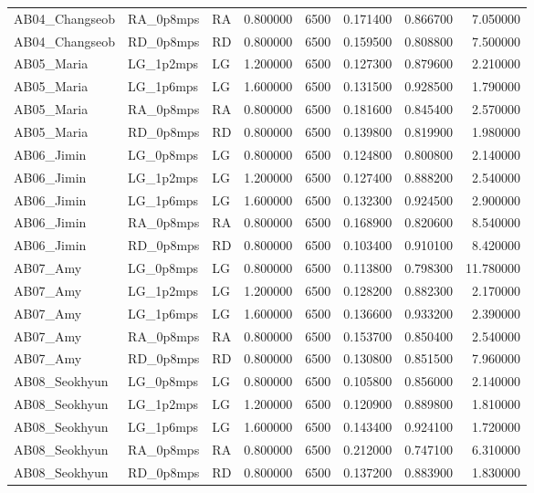 \begin{table}
\begin{tabular}{lllrrrrr}
AB04\_Changseob & RA\_0p8mps & RA & 0.800000 & 6500 & 0.171400 & 0.866700 & 7.050000 \\
AB04\_Changseob & RD\_0p8mps & RD & 0.800000 & 6500 & 0.159500 & 0.808800 & 7.500000 \\
AB05\_Maria & LG\_1p2mps & LG & 1.200000 & 6500 & 0.127300 & 0.879600 & 2.210000 \\
AB05\_Maria & LG\_1p6mps & LG & 1.600000 & 6500 & 0.131500 & 0.928500 & 1.790000 \\
AB05\_Maria & RA\_0p8mps & RA & 0.800000 & 6500 & 0.181600 & 0.845400 & 2.570000 \\
AB05\_Maria & RD\_0p8mps & RD & 0.800000 & 6500 & 0.139800 & 0.819900 & 1.980000 \\
AB06\_Jimin & LG\_0p8mps & LG & 0.800000 & 6500 & 0.124800 & 0.800800 & 2.140000 \\
AB06\_Jimin & LG\_1p2mps & LG & 1.200000 & 6500 & 0.127400 & 0.888200 & 2.540000 \\
AB06\_Jimin & LG\_1p6mps & LG & 1.600000 & 6500 & 0.132300 & 0.924500 & 2.900000 \\
AB06\_Jimin & RA\_0p8mps & RA & 0.800000 & 6500 & 0.168900 & 0.820600 & 8.540000 \\
AB06\_Jimin & RD\_0p8mps & RD & 0.800000 & 6500 & 0.103400 & 0.910100 & 8.420000 \\
AB07\_Amy & LG\_0p8mps & LG & 0.800000 & 6500 & 0.113800 & 0.798300 & 11.780000 \\
AB07\_Amy & LG\_1p2mps & LG & 1.200000 & 6500 & 0.128200 & 0.882300 & 2.170000 \\
AB07\_Amy & LG\_1p6mps & LG & 1.600000 & 6500 & 0.136600 & 0.933200 & 2.390000 \\
AB07\_Amy & RA\_0p8mps & RA & 0.800000 & 6500 & 0.153700 & 0.850400 & 2.540000 \\
AB07\_Amy & RD\_0p8mps & RD & 0.800000 & 6500 & 0.130800 & 0.851500 & 7.960000 \\
AB08\_Seokhyun & LG\_0p8mps & LG & 0.800000 & 6500 & 0.105800 & 0.856000 & 2.140000 \\
AB08\_Seokhyun & LG\_1p2mps & LG & 1.200000 & 6500 & 0.120900 & 0.889800 & 1.810000 \\
AB08\_Seokhyun & LG\_1p6mps & LG & 1.600000 & 6500 & 0.143400 & 0.924100 & 1.720000 \\
AB08\_Seokhyun & RA\_0p8mps & RA & 0.800000 & 6500 & 0.212000 & 0.747100 & 6.310000 \\
AB08\_Seokhyun & RD\_0p8mps & RD & 0.800000 & 6500 & 0.137200 & 0.883900 & 1.830000 \\
\bottomrule
\end{tabular}
\end{table}
